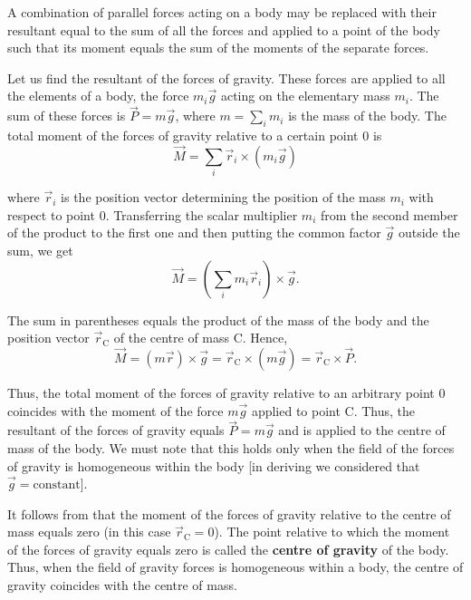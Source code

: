 A combination of parallel forces acting on a body may be replaced with their resultant equal to the sum of all the forces and applied to a point of the body such that its moment equals the sum of the moments of the separate forces. 

Let us find the resultant of the forces of gravity. These forces are applied to all the elements of a body, the force $m_i\vec{g}$ acting on the elementary mass $m_i$. The sum of these forces is $\vec{P}=m\vec{g}$, where $m=\sum_im_i$ is the mass of the body. The total moment of the forces of gravity relative to a certain point $0$ is
\begin{equation*}
	\vec{M} = \sum_i \vec{r}_i \times (m_i \vec{g})
\end{equation*}

\noindent
where $\vec{r}_i$ is the position vector determining the position of the mass $m_i$ with respect to point $0$. Transferring the scalar multiplier $m_i$ from the second member of the product to the first one and then putting the common factor $\vec{g}$ outside the sum, we get
\begin{equation*}
	\vec{M} = \left(\sum_i m_i \vec{r}_i\right) \times \vec{g}.
\end{equation*}

\noindent
The sum in parentheses equals the product of the mass of the body and the position vector $\vec{r}_{\text{C}}$ of the centre of mass C. Hence,
\begin{equation}\label{eq:5_56}
	\vec{M} = (m\vec{r})\times\vec{g} = \vec{r}_{\text{C}} \times (m\vec{g}) = \vec{r}_{\text{C}} \times \vec{P}.
\end{equation}

\noindent
Thus, the total moment of the forces of gravity relative to an arbitrary point $0$ coincides with the moment of the force $m\vec{g}$ applied to point C. Thus, the resultant of the forces of gravity equals $\vec{P}=m\vec{g}$ and is applied to the centre of mass of the body. We must note that this holds only when the field of the forces of gravity is homogeneous within the body [in deriving  we considered that $\vec{g}=\text{constant}$].
	
It follows from  that the moment of the forces of gravity relative to the centre of mass equals zero (in this case $\vec{r}_{\text{C}}=0$). The point relative to which the moment of the forces of gravity equals zero is called the \textbf{centre of gravity} of the body. Thus, when the field of gravity forces is homogeneous within a body, the centre of gravity coincides with the centre of mass.

